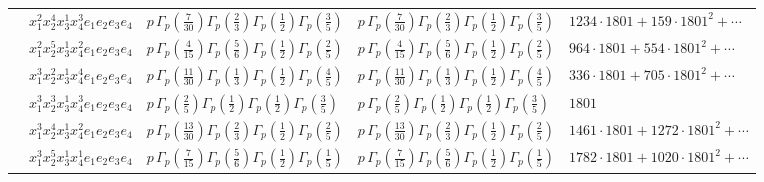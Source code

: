 \documentclass[11pt]{article}
\begin{document}
\begin{table}[ht]
{\begin{tabular}{@{}lllll@{}}
 & $x_{1}^{2} x_{2}^{4} x_{3}^{1} x_{4}^{3}  e_{1} e_{2} e_{3} e_{4}$ & $p \, \Gamma_p \left( \frac{7}{30} \right) \Gamma_p \left( \frac{2}{3} \right) \Gamma_p \left( \frac{1}{2} \right) \Gamma_p \left( \frac{3}{5} \right)$ & $p \, \Gamma_p \left( \frac{7}{30} \right) \Gamma_p \left( \frac{2}{3} \right) \Gamma_p \left( \frac{1}{2} \right) \Gamma_p \left( \frac{3}{5} \right)$ & $1234{\cdot}1801{+}159{\cdot}1801^{2}{+}\cdots$ \\
 & $x_{1}^{2} x_{2}^{5} x_{3}^{1} x_{4}^{2}  e_{1} e_{2} e_{3} e_{4}$ & $p \, \Gamma_p \left( \frac{4}{15} \right) \Gamma_p \left( \frac{5}{6} \right) \Gamma_p \left( \frac{1}{2} \right) \Gamma_p \left( \frac{2}{5} \right)$ & $p \, \Gamma_p \left( \frac{4}{15} \right) \Gamma_p \left( \frac{5}{6} \right) \Gamma_p \left( \frac{1}{2} \right) \Gamma_p \left( \frac{2}{5} \right)$ & $964{\cdot}1801{+}554{\cdot}1801^{2}{+}\cdots$ \\
 & $x_{1}^{3} x_{2}^{2} x_{3}^{1} x_{4}^{4}  e_{1} e_{2} e_{3} e_{4}$ & $p \, \Gamma_p \left( \frac{11}{30} \right) \Gamma_p \left( \frac{1}{3} \right) \Gamma_p \left( \frac{1}{2} \right) \Gamma_p \left( \frac{4}{5} \right)$ & $p \, \Gamma_p \left( \frac{11}{30} \right) \Gamma_p \left( \frac{1}{3} \right) \Gamma_p \left( \frac{1}{2} \right) \Gamma_p \left( \frac{4}{5} \right)$ & $336{\cdot}1801{+}705{\cdot}1801^{2}{+}\cdots$ \\
 & $x_{1}^{3} x_{2}^{3} x_{3}^{1} x_{4}^{3}  e_{1} e_{2} e_{3} e_{4}$ & $p \, \Gamma_p \left( \frac{2}{5} \right) \Gamma_p \left( \frac{1}{2} \right) \Gamma_p \left( \frac{1}{2} \right) \Gamma_p \left( \frac{3}{5} \right)$ & $p \, \Gamma_p \left( \frac{2}{5} \right) \Gamma_p \left( \frac{1}{2} \right) \Gamma_p \left( \frac{1}{2} \right) \Gamma_p \left( \frac{3}{5} \right)$ & $1801$ \\
 & $x_{1}^{3} x_{2}^{4} x_{3}^{1} x_{4}^{2}  e_{1} e_{2} e_{3} e_{4}$ & $p \, \Gamma_p \left( \frac{13}{30} \right) \Gamma_p \left( \frac{2}{3} \right) \Gamma_p \left( \frac{1}{2} \right) \Gamma_p \left( \frac{2}{5} \right)$ & $p \, \Gamma_p \left( \frac{13}{30} \right) \Gamma_p \left( \frac{2}{3} \right) \Gamma_p \left( \frac{1}{2} \right) \Gamma_p \left( \frac{2}{5} \right)$ & $1461{\cdot}1801{+}1272{\cdot}1801^{2}{+}\cdots$ \\
 & $x_{1}^{3} x_{2}^{5} x_{3}^{1} x_{4}^{1}  e_{1} e_{2} e_{3} e_{4}$ & $p \, \Gamma_p \left( \frac{7}{15} \right) \Gamma_p \left( \frac{5}{6} \right) \Gamma_p \left( \frac{1}{2} \right) \Gamma_p \left( \frac{1}{5} \right)$ & $p \, \Gamma_p \left( \frac{7}{15} \right) \Gamma_p \left( \frac{5}{6} \right) \Gamma_p \left( \frac{1}{2} \right) \Gamma_p \left( \frac{1}{5} \right)$ & $1782{\cdot}1801{+}1020{\cdot}1801^{2}{+}\cdots$ \\

\end{tabular}}
\end{table}
\end{document}
